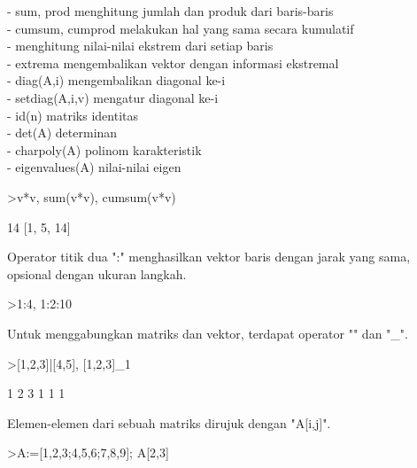 \documentclass[12pt,arial,letterpaper]{book}
\begin{document}
\begin{eulercomment}
\begin{eulercomment}
\begin{eulercomment}
\begin{eulercomment}
\begin{eulercomment}
\begin{eulercomment}
\begin{eulercomment}
- sum, prod menghitung jumlah dan produk dari baris-baris\\
- cumsum, cumprod melakukan hal yang sama secara kumulatif\\
- menghitung nilai-nilai ekstrem dari setiap baris\\
- extrema mengembalikan vektor dengan informasi ekstremal\\
- diag(A,i) mengembalikan diagonal ke-i\\
- setdiag(A,i,v) mengatur diagonal ke-i\\
- id(n) matriks identitas\\
- det(A) determinan\\
- charpoly(A) polinom karakteristik\\
- eigenvalues(A) nilai-nilai eigen
\end{eulercomment}
\begin{eulerprompt}
>v*v, sum(v*v), cumsum(v*v)
\end{eulerprompt}
\begin{euleroutput}
  [1,  4,  9]
  14
  [1,  5,  14]
\end{euleroutput}
\begin{eulercomment}
Operator titik dua ":" menghasilkan vektor baris dengan jarak yang
sama, opsional dengan ukuran langkah.
\end{eulercomment}
\begin{eulerprompt}
>1:4, 1:2:10
\end{eulerprompt}
\begin{euleroutput}
  [1,  2,  3,  4]
  [1,  3,  5,  7,  9]
\end{euleroutput}
\begin{eulercomment}
Untuk menggabungkan matriks dan vektor, terdapat operator "\textbar{}" dan "\_".
\end{eulercomment}
\begin{eulerprompt}
>[1,2,3]|[4,5], [1,2,3]_1
\end{eulerprompt}
\begin{euleroutput}
  [1,  2,  3,  4,  5]
              1             2             3 
              1             1             1 
\end{euleroutput}
\begin{eulercomment}
Elemen-elemen dari sebuah matriks dirujuk dengan "A[i,j]".
\end{eulercomment}
\begin{eulerprompt}
>A:=[1,2,3;4,5,6;7,8,9]; A[2,3]
\end{eulerprompt}
\begin{euleroutput}

\end{euleroutput}
\end{eulercomment}
\end{eulercomment}
\end{eulercomment}
\end{eulercomment}
\end{eulercomment}
\end{eulercomment}
\end{document}
